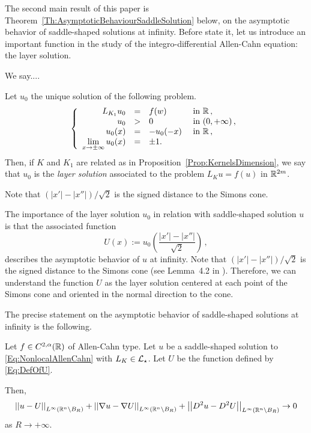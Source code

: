 The second main result of this paper is Theorem~\ref{Th:AsymptoticBehaviourSaddleSolution} below, on the asymptotic behavior of saddle-shaped solutions at infinity. Before state it, let us introduce an important function in the study of the integro-differential Allen-Cahn equation: the layer solution.


We say....



\begin{definition}
	Let $u_0$ the unique solution of the following problem.
	\begin{equation}
	\label{Eq:LayerSolution}
	\left\{\begin{array}{rcll}
	L_{K_1}  u_0 &=& f(w) & \textrm{ in }\mathbb{R}\,,\\
	u_0 &>& 0 & \textrm{ in } (0,+\infty)\,,\\
	u_0(x) & = &-u_0(-x)  & \textrm{ in }\mathbb{R}\,,\\
	\displaystyle \lim_{x \to \pm \infty} u_0(x) &=& \pm 1. & 
	\end{array} \right.
	\end{equation}
	Then, if $K$ and $K_1$ are related as in Proposition~\ref{Prop:KernelsDimension}, we say that $u_0$ is the \emph{layer solution} associated to the problem $L_K u = f(u)$ in $\mathbb{R}^{2m}$.
\end{definition}
Note that $(|x'| - |x''| )/\sqrt{2}$ is the signed distance to the Simons cone.


The importance of the layer solution $u_0$ in relation with saddle-shaped solution $u$ is that the associated function
	\begin{equation}
	\label{Eq:DefOfU}
	U(x):= u_0 \left( \dfrac{|x'| - |x''|}{\sqrt{2}} \right)\,,
	\end{equation}
describes the asymptotic behavior of $u$ at infinity. Note that $(|x'| - |x''| )/\sqrt{2}$ is the signed distance to the Simons cone (see Lemma~4.2 in \cite{CabreTerraII}). Therefore, we can understand the function $U$ as the layer solution centered at each point of the Simons cone and oriented in the normal direction to the cone.

The precise statement on the asymptotic behavior of saddle-shaped solutions at infinity is the following.

\begin{theorem}
	\label{Th:AsymptoticBehaviourSaddleSolution}
	Let $f\in C^{2,\alpha}(\mathbb{R})$ of Allen-Cahn type. Let $u$ be a saddle-shaped solution to \eqref{Eq:NonlocalAllenCahn} with $L_K \in \mathcal{L}_\star$. Let $U$ be the function defined by \eqref{Eq:DefOfU}.
	
	Then,
	$$
	\left | \left |{u-U} \right | \right |_{L^\infty(\mathbb{R}^n\setminus B_R)}
	+\left | \left |{\nabla u-\nabla U} \right | \right |_{L^\infty(\mathbb{R}^n\setminus B_R)}
	+\left | \left |{D^2u-D^2U} \right | \right |_{L^\infty(\mathbb{R}^n\setminus B_R)} \to 0
	$$
	as $ R\to +\infty$.
\end{theorem}

